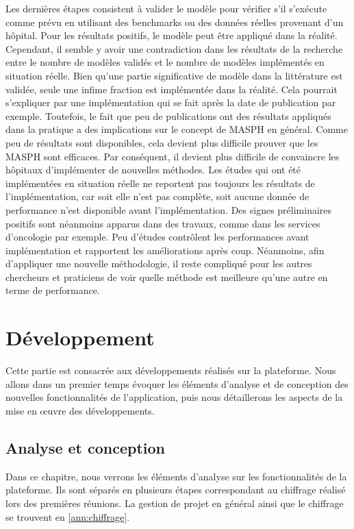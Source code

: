\documentclass{polytech/polytech}
\begin{document}
Les dernières étapes consistent à valider le modèle pour vérifier s'il s'exécute comme prévu en utilisant des benchmarks ou des données réelles provenant d'un hôpital. Pour les résultats positifs, le modèle peut être appliqué dans la réalité. Cependant, il semble y avoir une contradiction dans les résultats de la recherche entre le nombre de modèles validés et le nombre de modèles implémentés en situation réelle. Bien qu'une partie significative de modèle dans la littérature est validée, seule une infime fraction est implémentée dans la réalité. Cela pourrait s'expliquer par une implémentation qui se fait après la date de publication par exemple. Toutefois, le fait que peu de publications ont des résultats appliqués dans la pratique a des implications sur le concept de MASPH en général. Comme peu de résultats sont disponibles, cela devient plus difficile prouver que les MASPH sont efficaces. Par conséquent, il devient plus difficile de convaincre les hôpitaux d'implémenter de nouvelles méthodes. Les études qui ont été implémentées en situation réelle ne reportent pas toujours les résultats de l'implémentation, car soit elle n'est pas complète, soit aucune donnée de performance n'est disponible avant l'implémentation. Des signes préliminaires positifs sont néanmoins apparus dans des travaux, comme dans les services d'oncologie par exemple. Peu d'études contrôlent les performances avant implémentation et rapportent les améliorations après coup. Néanmoins, afin d'appliquer une nouvelle méthodologie, il reste compliqué pour les autres chercheurs et praticiens de voir quelle méthode est meilleure qu'une autre en terme de performance. 


\part{Développement}

Cette partie est consacrée aux développements réalisés sur la plateforme. Nous allons dans un premier temps évoquer les éléments d'analyse et de conception des nouvelles fonctionnalités de l'application, puis nous détaillerons les aspects de la mise en œuvre des développements. 


\chapter{Analyse et conception}


Dans ce chapitre, nous verrons les éléments d'analyse sur les fonctionnalités de la plateforme. Ils sont séparés en plusieurs étapes correspondant au chiffrage réalisé lors des premières réunions. La gestion de projet en général ainsi que le chiffrage se trouvent en \autoref{ann:chiffrage}.
\end{document}
